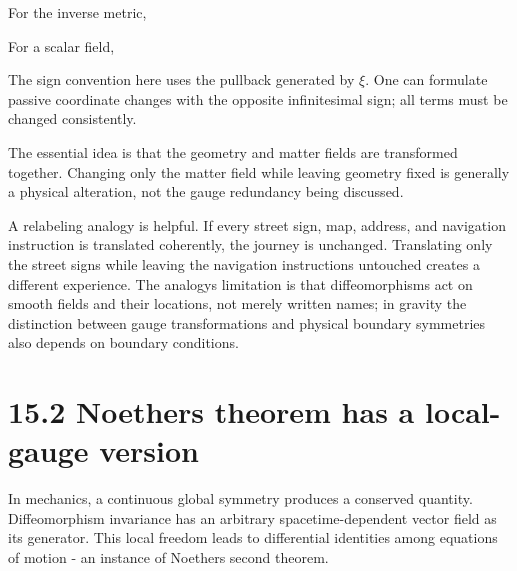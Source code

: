 \documentclass[
  11pt,
  letterpaper,
  oneside,
  openany]{scrbook}
\begin{document}
For the inverse metric,

\begin{center}
\begingroup
{}
\ifdim\wd\grmathbox>\linewidth
\resizebox{\linewidth}{!}{\usebox{\grmathbox}}
\else\usebox{\grmathbox}\fi
\endgroup
\end{center}

For a scalar field,

\begin{center}
\begingroup
{}
\ifdim\wd\grmathbox>\linewidth
\resizebox{\linewidth}{!}{\usebox{\grmathbox}}
\else\usebox{\grmathbox}\fi
\endgroup
\end{center}

The sign convention here uses the pullback generated by \(\xi\). One can
formulate passive coordinate changes with the opposite infinitesimal
sign; all terms must be changed consistently.

The essential idea is that the geometry and matter fields are
transformed together. Changing only the matter field while leaving
geometry fixed is generally a physical alteration, not the gauge
redundancy being discussed.

A relabeling analogy is helpful. If every street sign, map, address, and
navigation instruction is translated coherently, the journey is
unchanged. Translating only the street signs while leaving the
navigation instructions untouched creates a different experience. The
analogy\textquotesingle s limitation is that diffeomorphisms act on
smooth fields and their locations, not merely written names; in gravity
the distinction between gauge transformations and physical boundary
symmetries also depends on boundary conditions.

\hypertarget{noethers-theorem-has-a-local-gauge-version}{%
\section{15.2 Noether\textquotesingle s theorem has a local-gauge
version}\label{noethers-theorem-has-a-local-gauge-version}}

In mechanics, a continuous global symmetry produces a conserved
quantity. Diffeomorphism invariance has an arbitrary spacetime-dependent
vector field as its generator. This local freedom leads to differential
identities among equations of motion - an instance of
Noether\textquotesingle s second theorem.
\end{document}
